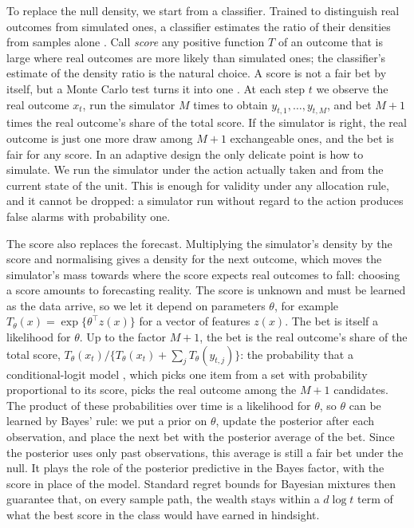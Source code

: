 \documentclass[11pt]{article}
\theoremstyle{remark}
\begin{document}
To replace the null density, we start from a classifier. Trained to
distinguish real outcomes from simulated ones, a classifier estimates the
ratio of their densities from samples alone \citep{thomas2022lfire}. Call
\emph{score} any positive function $T$ of an outcome that is large where real
outcomes are more likely than simulated ones; the classifier's estimate of the
density ratio is the natural choice. A score is not a fair bet by itself, but
a Monte Carlo test turns it into one \citep{besag1989generalized}. At each
step $t$ we observe the real outcome $x_t$, run the simulator $M$ times to
obtain $y_{t,1},\dots,y_{t,M}$, and bet $M+1$ times the real outcome's share
of the total score. If the simulator is right, the real outcome is just one
more draw among $M+1$ exchangeable ones, and the bet is fair for any score. In
an adaptive design the only delicate point is how to simulate. We run the
simulator under the action actually taken and from the current state of the
unit. This is enough for validity under any allocation rule, and it cannot be
dropped: a simulator run without regard to the action produces false alarms
with probability one.

The score also replaces the forecast. Multiplying the simulator's density by
the score and normalising gives a density for the next outcome, which moves
the simulator's mass towards where the score expects real outcomes to fall:
choosing a score amounts to forecasting reality. The score is unknown and must
be learned as the data arrive, so we let it depend on parameters $\theta$, for
example $T_\theta(x) = \exp\{\theta^\top z(x)\}$ for a vector of features
$z(x)$. The bet is itself a likelihood for $\theta$. Up to the factor $M+1$,
the bet is the real outcome's share of the total score,
$T_\theta(x_t)/\{T_\theta(x_t) + \sum_{j} T_\theta(y_{t,j})\}$: the
probability that a conditional-logit model \citep{mcfadden1974conditional},
which picks one item from a set
with probability proportional to its score, picks the real outcome among the
$M+1$ candidates. The product of these probabilities over time is a likelihood
for $\theta$, so $\theta$ can be learned by Bayes' rule: we put a prior on
$\theta$, update the posterior after each observation, and place the next bet
with the posterior average of the bet. Since the posterior uses only past
observations, this average is still a fair bet under the null. It plays the
role of the posterior predictive in the Bayes factor, with the score in place
of the model. Standard regret bounds for Bayesian mixtures
\citep{kakade2005online} then guarantee that, on every sample path, the wealth
stays within a $d\log t$ term of what the best score in the class would have
earned in hindsight.
\end{document}
